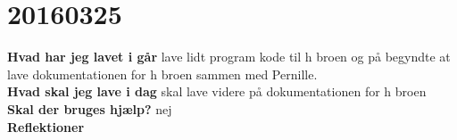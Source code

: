 \documentclass{article}
\begin{document}
					\section{20160325}
					
					\textbf{Hvad har jeg lavet i går}
					lave lidt program kode til h broen og på begyndte at lave dokumentationen for h broen sammen med Pernille. 
					\\
					\textbf{Hvad skal jeg lave i dag}
					skal lave videre på dokumentationen for h broen  
					\\
					\textbf{Skal der bruges hjælp?}
					nej
					\\
					\textbf{Reflektioner}
\end{document}
